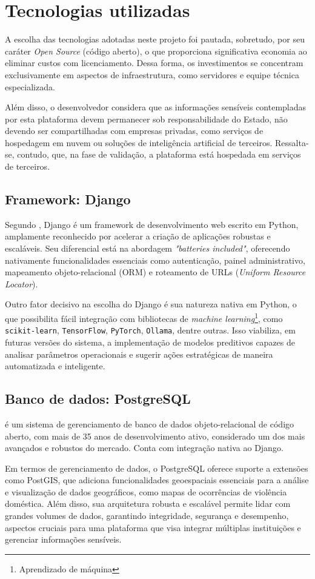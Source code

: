 \section{Tecnologias utilizadas}
\par A escolha das tecnologias adotadas neste projeto foi pautada, sobretudo, por seu caráter \textit{Open Source} (código aberto), o que proporciona significativa economia ao eliminar custos com licenciamento. Dessa forma, os investimentos se concentram exclusivamente em aspectos de infraestrutura, como servidores e equipe técnica especializada.
\par Além disso, o desenvolvedor considera que as informações sensíveis contempladas por esta plataforma devem permanecer sob responsabilidade do Estado, não devendo ser compartilhadas com empresas privadas, como serviços de hospedagem em nuvem ou soluções de inteligência artificial de terceiros. Ressalta-se, contudo, que, na fase de validação, a plataforma está hospedada em serviços de terceiros.

\subsection{Framework: Django}
\par Segundo , Django é um framework de desenvolvimento web escrito em Python, amplamente reconhecido por acelerar a criação de aplicações robustas e escaláveis. Seu diferencial está na abordagem \textit{"batteries included"}, oferecendo nativamente funcionalidades essenciais como autenticação, painel administrativo, mapeamento objeto-relacional (ORM) e roteamento de URLs (\textit{Uniform Resource Locator}).
\par Outro fator decisivo na escolha do Django é sua natureza nativa em Python, o que possibilita fácil integração com bibliotecas de \textit{machine learning}\footnote{Aprendizado de máquina}, como \texttt{scikit-learn}, \texttt{TensorFlow}, \texttt{PyTorch}, \texttt{Ollama}, dentre outras. Isso viabiliza, em futuras versões do sistema, a implementação de modelos preditivos capazes de analisar parâmetros operacionais e sugerir ações estratégicas de maneira automatizada e inteligente.

\subsection{Banco de dados: PostgreSQL}
\par {} é um sistema de gerenciamento de banco de dados objeto-relacional de código aberto, com mais de 35 anos de desenvolvimento ativo, considerado um dos mais avançados e robustos do mercado. Conta com integração nativa ao Django.
\par Em termos de gerenciamento de dados, o PostgreSQL oferece suporte a extensões como PostGIS, que adiciona funcionalidades geoespaciais essenciais para a análise e visualização de dados geográficos, como mapas de ocorrências de violência doméstica. Além disso, sua arquitetura robusta e escalável permite lidar com grandes volumes de dados, garantindo integridade, segurança e desempenho, aspectos cruciais para uma plataforma que visa integrar múltiplas instituições e gerenciar informações sensíveis.

